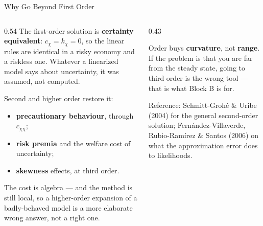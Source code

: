 \begin{frame}{Why Go Beyond First Order}
\begin{columns}[T]
\begin{column}{0.54\textwidth}
\small
The first-order solution is \textbf{certainty equivalent}: $c_\chi=k_\chi=0$, so the linear rules are identical in a risky economy and a riskless one. Whatever a linearized model says about uncertainty, it was assumed, not computed.
\medskip

Second and higher order restore it:
\begin{itemize}\small
  \item \textbf{precautionary behaviour}, through $c_{\chi\chi}$;
  \item \textbf{risk premia} and the welfare cost of uncertainty;
  \item \textbf{skewness} effects, at third order.
\end{itemize}
\medskip
The cost is algebra --- and the method is still local, so a higher-order expansion of a badly-behaved model is a more elaborate wrong answer, not a right one.
\end{column}
\begin{column}{0.43\textwidth}
\begin{takeawaybox}\footnotesize
Order buys \textbf{curvature}, not \textbf{range}. If the problem is that you are far from the steady state, going to third order is the wrong tool --- that is what Block B is for.
\end{takeawaybox}
\medskip
\begin{examplebox}\footnotesize
Reference: Schmitt-Groh\'e \& Uribe (2004) for the general second-order solution; Fern\'andez-Villaverde, Rubio-Ram\'irez \& Santos (2006) on what the approximation error does to likelihoods.
\end{examplebox}
\end{column}
\end{columns}
\vspace{1mm}
\end{frame}

